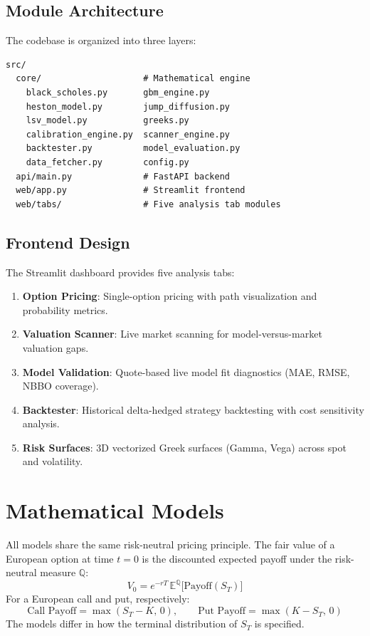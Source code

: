 \documentclass[12pt,a4paper]{article}
\begin{document}
\subsection{Module Architecture}

The codebase is organized into three layers:
\begin{lstlisting}[language={},caption={Project structure.}]
src/
  core/                    # Mathematical engine
    black_scholes.py       gbm_engine.py
    heston_model.py        jump_diffusion.py
    lsv_model.py           greeks.py
    calibration_engine.py  scanner_engine.py
    backtester.py          model_evaluation.py
    data_fetcher.py        config.py
  api/main.py              # FastAPI backend
  web/app.py               # Streamlit frontend
  web/tabs/                # Five analysis tab modules
\end{lstlisting}

\subsection{Frontend Design}

The Streamlit dashboard provides five analysis tabs:
\begin{enumerate}
\item \textbf{Option Pricing}: Single-option pricing with path visualization and probability metrics.
\item \textbf{Valuation Scanner}: Live market scanning for model-versus-market valuation gaps.
\item \textbf{Model Validation}: Quote-based live model fit diagnostics (MAE, RMSE, NBBO coverage).
\item \textbf{Backtester}: Historical delta-hedged strategy backtesting with cost sensitivity analysis.
\item \textbf{Risk Surfaces}: 3D vectorized Greek surfaces (Gamma, Vega) across spot and volatility.
\end{enumerate}

\section{Mathematical Models}

All models share the same risk-neutral pricing principle. The fair value of a European option at time $t=0$ is the discounted expected payoff under the risk-neutral measure $\mathbb{Q}$:
\begin{equation}
V_0 = e^{-rT}\,\mathbb{E}^{\mathbb{Q}}\bigl[\text{Payoff}(S_T)\bigr]
\end{equation}
For a European call and put, respectively:
\begin{equation}
\text{Call Payoff} = \max(S_T - K,\, 0), \qquad \text{Put Payoff} = \max(K - S_T,\, 0)
\end{equation}
The models differ in how the terminal distribution of $S_T$ is specified.
\end{document}
